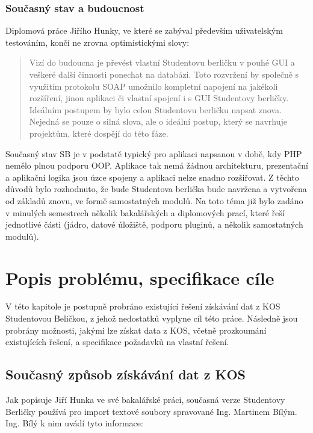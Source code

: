 \documentclass[11pt,twoside,a4paper]{book}
\begin{document}
\subsection{Současný stav a budoucnost}

Diplomová práce Jiřího Hunky, ve které se zabýval především uživatelským testováním, končí ne zrovna optimistickými slovy: 
\begin{quotation}
Vizí do budoucna je převést vlastní Studentovu berličku v pouhé GUI a
veškeré další činnosti ponechat na databázi. Toto rozvržení by společně
s využitím protokolu SOAP umožnilo kompletní napojení na jakékoli rozšíření, jinou aplikaci či vlastní spojení i s GUI Studentovy berličky.
Ideálním postupem by bylo celou Studentovu berličku napsat znova. Nejedná se pouze o silná slova, ale o ideální postup, který se navrhuje projektům, které dospějí do této fáze.
\end{quotation}

Současný stav SB je v podstatě typický pro aplikaci napsanou v době, kdy PHP nemělo plnou podporu OOP. Aplikace tak nemá žádnou architekturu, prezentační a aplikační logika jsou úzce spojeny a aplikaci nelze snadno rozšiřovat. Z těchto důvodů bylo rozhodnuto, že bude Studentova berlička bude navržena a vytvořena od základů znovu, ve formě samostatných modulů. Na toto téma již bylo zadáno v minulých semestrech několik bakalářských a diplomových prací, které řeší jednotlivé části (jádro, datové úložiště, podporu pluginů, a několik samostatných modulů).



\chapter{Popis problému, specifikace cíle}
\label{popis}
V této kapitole je postupně probráno existující řešení získávání dat z KOS Studentovou Beličkou, z jehož nedostatků vyplyne cíl této práce. Následně jsou probrány možnosti, jakými lze získat data z KOS, včetně prozkoumání existujících řešení, a specifikace požadavků na vlastní řešení.  

\section{Současný způsob získávání dat z KOS}
Jak popisuje Jiří Hunka ve své bakalářské práci\cite{hunka:bp}, současná verze Studentovy Berličky používá pro import textové soubory spravované Ing. Martinem Bílým. Ing. Bílý k nim uvádí tyto informace:
\end{document}
